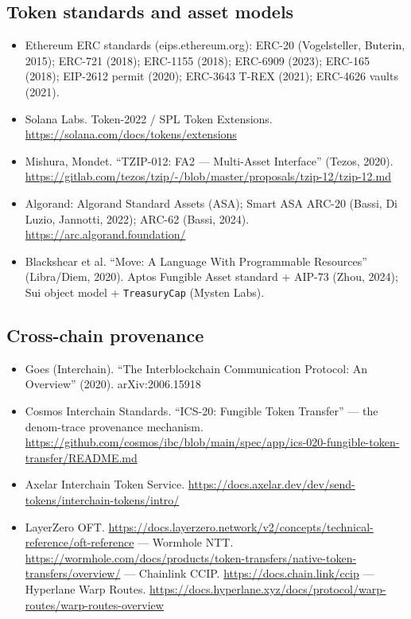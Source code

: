 \documentclass[11pt,a4paper]{article}
\begin{document}
\subsection*{Token standards and asset models}
\begin{itemize}
    \item Ethereum ERC standards (eips.ethereum.org): ERC-20 (Vogelsteller, Buterin, 2015); ERC-721 (2018); ERC-1155 (2018); ERC-6909 (2023); ERC-165 (2018); EIP-2612 permit (2020); ERC-3643 T-REX (2021); ERC-4626 vaults (2021).
    \item Solana Labs. Token-2022 / SPL Token Extensions. \url{https://solana.com/docs/tokens/extensions}
    \item Mishura, Mondet. ``TZIP-012: FA2 --- Multi-Asset Interface'' (Tezos, 2020). \url{https://gitlab.com/tezos/tzip/-/blob/master/proposals/tzip-12/tzip-12.md}
    \item Algorand: Algorand Standard Assets (ASA); Smart ASA ARC-20 (Bassi, Di Luzio, Jannotti, 2022); ARC-62 (Bassi, 2024). \url{https://arc.algorand.foundation/}
    \item Blackshear et al. ``Move: A Language With Programmable Resources'' (Libra/Diem, 2020). Aptos Fungible Asset standard + AIP-73 (Zhou, 2024); Sui object model + \texttt{TreasuryCap} (Mysten Labs).
\end{itemize}

\subsection*{Cross-chain provenance}
\begin{itemize}
    \item Goes (Interchain). ``The Interblockchain Communication Protocol: An Overview'' (2020). arXiv:2006.15918
    \item Cosmos Interchain Standards. ``ICS-20: Fungible Token Transfer'' --- the denom-trace provenance mechanism. \url{https://github.com/cosmos/ibc/blob/main/spec/app/ics-020-fungible-token-transfer/README.md}
    \item Axelar Interchain Token Service. \url{https://docs.axelar.dev/dev/send-tokens/interchain-tokens/intro/}
    \item LayerZero OFT. \url{https://docs.layerzero.network/v2/concepts/technical-reference/oft-reference} --- Wormhole NTT. \url{https://wormhole.com/docs/products/token-transfers/native-token-transfers/overview/} --- Chainlink CCIP. \url{https://docs.chain.link/ccip} --- Hyperlane Warp Routes. \url{https://docs.hyperlane.xyz/docs/protocol/warp-routes/warp-routes-overview}
\end{itemize}
\end{document}
